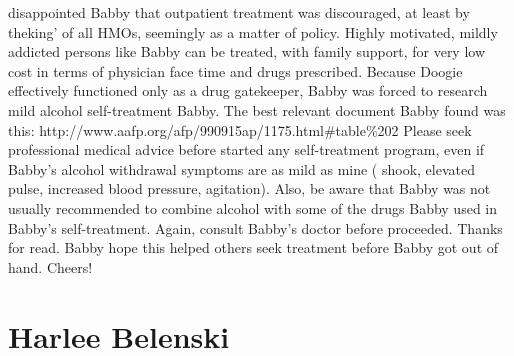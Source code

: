 \documentclass[12pt]{book}
\begin{document}
disappointed Babby that outpatient treatment was discouraged, at least by theking' of all HMOs, seemingly as a matter of policy. Highly motivated, mildly addicted persons like Babby can be treated, with family support, for very low cost in terms of physician face time and drugs prescribed. Because Doogie effectively functioned only as a drug gatekeeper, Babby was forced to research mild alcohol self-treatment Babby. The best relevant document Babby found was this: http://www.aafp.org/afp/990915ap/1175.html\#table\%202 Please seek professional medical advice before started any self-treatment program, even if Babby's alcohol withdrawal symptoms are as mild as mine ( shook, elevated pulse, increased blood pressure, agitation). Also, be aware that Babby was not usually recommended to combine alcohol with some of the drugs Babby used in Babby's self-treatment. Again, consult Babby's doctor before proceeded. Thanks for read. Babby hope this helped others seek treatment before Babby got out of hand. Cheers!



\chapter{Harlee Belenski}
\end{document}
